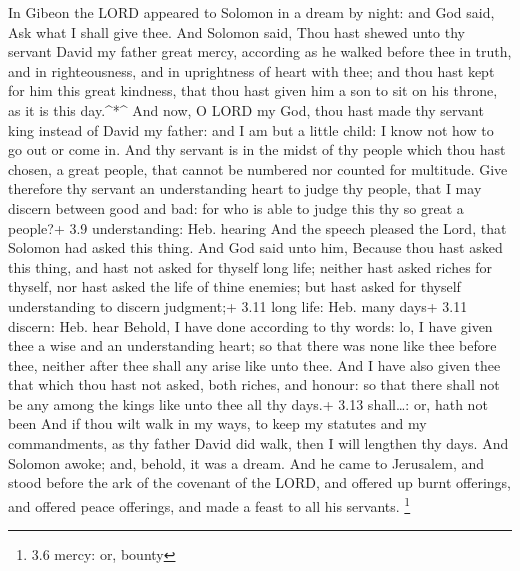  In Gibeon the LORD appeared to Solomon in a dream by night:
and God said, Ask what I shall give thee.  And Solomon said,
Thou hast shewed unto thy servant David my father great mercy, according
as he walked before thee in truth, and in righteousness, and in
uprightness of heart with thee; and thou hast kept for him this great
kindness, that thou hast given him a son to sit on his throne, as it is
this day.\^{}*\^{}  And now, O LORD my God, thou hast made
thy servant king instead of David my father: and I am but a little
child: I know not how to go out or come in.  And thy servant
is in the midst of thy people which thou hast chosen, a great people,
that cannot be numbered nor counted for multitude.  Give
therefore thy servant an understanding heart to judge thy people, that I
may discern between good and bad: for who is able to judge this thy so
great a people?+ 3.9 understanding: Heb. hearing  And the
speech pleased the Lord, that Solomon had asked this thing.
 And God said unto him, Because thou hast asked this thing,
and hast not asked for thyself long life; neither hast asked riches for
thyself, nor hast asked the life of thine enemies; but hast asked for
thyself understanding to discern judgment;+ 3.11 long life: Heb. many
days+ 3.11 discern: Heb. hear  Behold, I have done
according to thy words: lo, I have given thee a wise and an
understanding heart; so that there was none like thee before thee,
neither after thee shall any arise like unto thee.  And I
have also given thee that which thou hast not asked, both riches, and
honour: so that there shall not be any among the kings like unto thee
all thy days.+ 3.13 shall\ldots: or, hath not been  And if
thou wilt walk in my ways, to keep my statutes and my commandments, as
thy father David did walk, then I will lengthen thy days. 
And Solomon awoke; and, behold, it was a dream. And he came to
Jerusalem, and stood before the ark of the covenant of the LORD, and
offered up burnt offerings, and offered peace offerings, and made a
feast to all his servants. \footnote{3.6 mercy: or, bounty}


